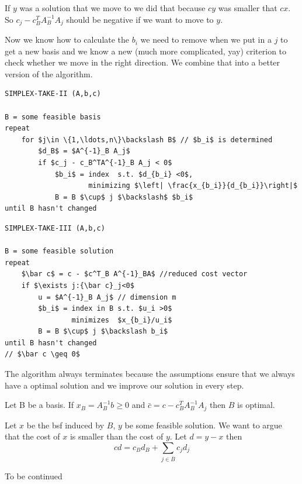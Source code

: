 If $y$ was a solution that we move to we did that because $cy$ was smaller that $cx$. So $c_j - c_B^TA^{-1}_B A_j$ should be negative if we want to move to $y$.

Now we know how to calculate the $b_i$ we need to remove when we put in a $j$ to get a new basis and we know a new (much more complicated, yay) criterion to check whether we move in the right direction. We combine that into a better version of the algorithm.

\begin{center}
\begin{lstlisting}
SIMPLEX-TAKE-II (A,b,c)

B = some feasible basis
repeat 
    for $j\in \{1,\ldots,n\}\backslash B$ // $b_i$ is determined
        $d_B$ = $A^{-1}_B A_j$
        if $c_j - c_B^TA^{-1}_B A_j < 0$
            $b_i$ = index  s.t. $d_{b_i} <0$, 
                    minimizing $\left| \frac{x_{b_i}}{d_{b_i}}\right|$
            B = B $\cup$ j $\backslash$ $b_i$
until B hasn't changed
\end{lstlisting}
\end{center}

\begin{center}
\begin{lstlisting}
SIMPLEX-TAKE-III (A,b,c)

B = some feasible solution
repeat
    $\bar c$ = c - $c^T_B A^{-1}_BA$ //reduced cost vector
    if $\exists j:{\bar c}_j<0$ 
        u = $A^{-1}_B A_j$ // dimension m
        $b_i$ = index in B s.t. $u_i >0$ 
                minimizes  $x_{b_i}/u_i$
        B = B $\cup$ j $\backslash b_i$ 
until B hasn't changed 
// $\bar c \geq 0$ 
\end{lstlisting}
\end{center}

The algorithm always terminates because the assumptions ensure that we always have a optimal solution and we improve our solution in every step.

\begin{thm}\label{Pr:simplexIIIopt} Let B be a basis. If $x_B=A^{-1}_Bb\geq 0$ and $\bar c=c-c_B^{T}A_B^{-1}A_j$ then $B$ is optimal.\end{thm}

\begin{pr} Let $x$ be the bsf induced by $B$, $y$ be some feasible solution. We want to argue that the cost of $x$ is smaller than the cost of $y$. Let $d=y-x$ then 
\[cd = c_Bd_B + \sum_{j\in \bar B} c_jd_j \] 

To be continued
\end{pr}